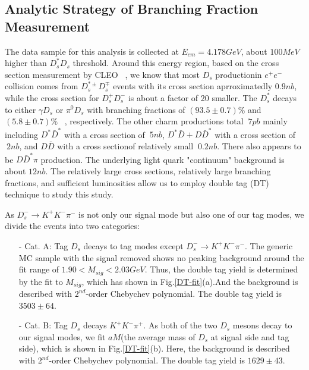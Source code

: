 \par{
    \subsection{Analytic Strategy of Branching Fraction Measurement}
    The data sample for this analysis is collected at $E_{cm}=4.178GeV$, about $100MeV$ higher than $D_{s}^{*}D_{s}$ threshold. Around this energy region, based on the cross section measurement by CLEO ~\cite{PRD80-072001}, we know that most $D_{s}$ productionin $e^{+}e^{-}$ collision comes from $D_{s}^{*\pm}D_{s}^{\mp}$ events with its cross section aprroximatedly $0.9nb$, while the cross section for $D_{s}^{+}D_{s}^{-}$ is about a factor of 20 smaller.
    The $D_{s}^{*}$ decays to either $\gamma D_{s}$ or $\pi^{0}D_{s}$ with branching fractions of $(93.5\pm0.7)\%$ and $(5.8\pm0.7)\%$ ~\cite{PDG2018}, respectively. 
    The other charm productions total $~7pb$ mainly including $D^{*}\bar{D}^{*}$ with a cross section of $~5nb$, $D^{*}\bar{D} + D\bar{D}^{*}$ with a cross section of $~2nb$, and $D\bar{D}$ with a cross sectionof relatively small $~0.2 nb$.
    There also appears to be $D\bar{D}^{*}\pi$ production.
    The underlying light quark "continuum" background is about $12 nb$. 
    The relatively large cross sections, relatively large branching fractions, and sufficient luminosities allow us to employ double tag (DT) technique to study this study.

    As $D_{s}^{-} \rightarrow K^{+}K^{-}\pi^{-}$ is not only our signal mode but also one of our tag modes, we divide the events into two categories:

    \begin{itemize}
        \item[-] Cat. A: Tag $D_{s}$ decays to tag modes except $D_{s}^{-} \rightarrow K^{+}K^{-}\pi^{-}$. The generic MC sample with the signal removed shows no peaking background around the fit range of $1.90 < M_{sig} < 2.03 GeV$.
            Thus, the double tag yield is determined by the fit to $M_{sig}$, which has shown in Fig.\ref{DT-fit}(a).And the background is described with $2^{nd}$-order Chebychev polynomial. The double tag yield is $3503\pm64$. 
        \item[-] Cat. B: Tag $D_{s}$ decays $K^{+}K^{-}\pi^{+}$. As both of the two $D_{s}$ mesons decay to our signal modes, we fit $aM$(the average mass of $D_{s}$ at signal side and tag side), which is shown in Fig.\ref{DT-fit}(b). 
            Here, the background is described with $2^{nd}$-order Chebychev polynomial. The double tag yield is $1629\pm43$. 
    \end{itemize}

}
